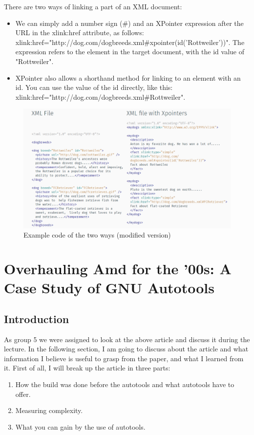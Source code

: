 \documentclass[11pt]{article}
\begin{document}
There are two ways of linking a part of an XML document:
\begin{itemize}
\item We can simply add a number sign (\#) and an XPointer expression after the URL in the xlink:href attribute, as follows:
xlink:href="http://dog.com/dogbreeds.xml\#xpointer(id('Rottweiler'))". The expression refers to the element in the target document, with the id value of "Rottweiler".
\item XPointer also allows a shorthand method for linking to an element with an id. You can use the value of the id directly, like this: xlink:href="http://dog.com/dogbreeds.xml\#Rottweiler".
\end{itemize}
\begin{figure}[!htb]
\centering
  \includegraphics[width=.9\linewidth]{images/xpointerExample}
  \caption{Example code of the two ways (modified version) \cite{W3CSchools}}
  \label{fig:xpointerExample}
\end{figure}
\FloatBarrier


\section{Overhauling Amd for the ’00s: A Case Study of GNU Autotools}
\subsection{Introduction}
As group 5 we were assigned to look at the above article and discuss it during the lecture. In the following section, I am going to discuss about the article and what information I believe is useful to grasp from the paper, and what I learned from it. First of all, I will break up the article in three parts:
\begin{enumerate}
\item How the build was done before the autotools and what autotools have to offer.
\item Measuring complexity.
\item What you can gain by the use of autotools.
\end{enumerate}
\end{document}
